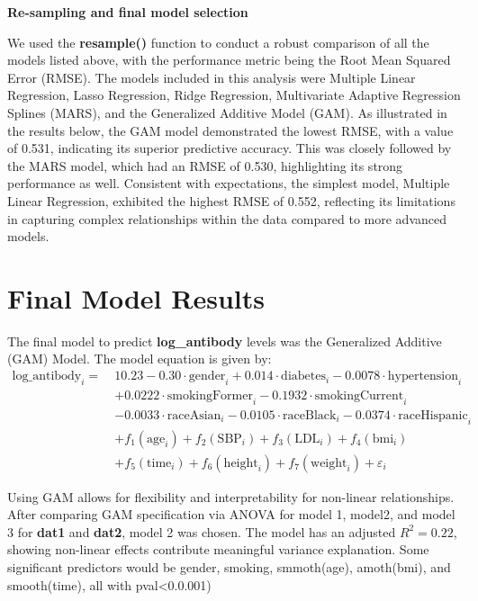 \documentclass[
]{article}
\begin{document}
\textbf{Re-sampling and final model selection}

We used the \textbf{resample()} function to conduct a robust comparison of all the models listed above, with the performance metric being the Root Mean Squared Error (RMSE). The models included in this analysis were Multiple Linear Regression, Lasso Regression, Ridge Regression, Multivariate Adaptive Regression Splines (MARS), and the Generalized Additive Model (GAM). As illustrated in the results below, the GAM model demonstrated the lowest RMSE, with a value of 0.531, indicating its superior predictive accuracy. This was closely followed by the MARS model, which had an RMSE of 0.530, highlighting its strong performance as well. Consistent with expectations, the simplest model, Multiple Linear Regression, exhibited the highest RMSE of 0.552, reflecting its limitations in capturing complex relationships within the data compared to more advanced models.

\section{Final Model Results}\label{final-model-results}

The final model to predict \textbf{log\_antibody} levels was the Generalized Additive (GAM) Model. The model equation is given by:
\[
\begin{aligned}
\text{log_antibody}_i =\ & 
\mathbf{10.23} 
- \mathbf{0.30} \cdot \text{gender}_i 
+ \mathbf{0.014} \cdot \text{diabetes}_i 
- \mathbf{0.0078} \cdot \text{hypertension}_i \\
& + \mathbf{0.0222} \cdot \text{smokingFormer}_i 
- \mathbf{0.1932} \cdot \text{smokingCurrent}_i \\
& - \mathbf{0.0033} \cdot \text{raceAsian}_i 
- \mathbf{0.0105} \cdot \text{raceBlack}_i 
- \mathbf{0.0374} \cdot \text{raceHispanic}_i \\
& + f_1(\text{age}_i) 
+ f_2(\text{SBP}_i) 
+ f_3(\text{LDL}_i) 
+ f_4(\text{bmi}_i) \\
& + f_5(\text{time}_i) 
+ f_6(\text{height}_i) 
+ f_7(\text{weight}_i) 
+ \varepsilon_i
\end{aligned}
\]

Using GAM allows for flexibility and interpretability for non-linear relationships. After comparing GAM specification via ANOVA for model 1, model2, and model 3 for \textbf{dat1} and \textbf{dat2}, model 2 was chosen. The model has an adjusted \(R^2 = 0.22\), showing non-linear effects contribute meaningful variance explanation. Some significant predictors would be gender, smoking, smmoth(age), amoth(bmi), and smooth(time), all with pval\textless0.0.001)
\end{document}
